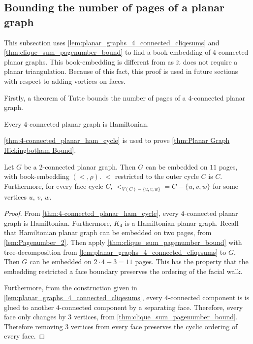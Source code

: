\subsection{Bounding the number of pages of a planar graph}
This subsection uses \cref{lem:planar_graphs_4_connected_cliqesums} and \cref{thm:clique_sum_pagenumber_bound} to find a book-embedding of 4-connected planar graphs. This book-embedding is different from \textcite{yannakakisEmbeddingPlanarGraphs1989} as it does not require a planar triangulation. Because of this fact, this proof is used in future sections with respect to adding vortices on faces. 

Firstly, a theorem of Tutte bounds the number of pages of a $4$-connected planar graph.

\begin{theorem}\label{thm:4-connected_planar_ham_cycle}
	Every 4-connected planar graph is Hamiltonian.
\end{theorem}

\cref{thm:4-connected_planar_ham_cycle} is used to prove \cref{thm:Planar Graph Hickingbotham Bound}.

\begin{corollary}\label{thm:Planar Graph Hickingbotham Bound}
	Let \(G\) be a 2-connected planar graph. Then $G$ can be embedded on $11$ pages, with book-embedding $(<, \rho)$. $<$ restricted to the outer cycle $C$ is $C$. Furthermore, for every face cycle $C$, $<_{V(C) - \{u, v, w\}} = C - \{u, v, w\}$ for some vertices $u$, $v$, $w$. 
\end{corollary}
\begin{proof}
	From \cref{thm:4-connected_planar_ham_cycle}, every $4$-connected planar graph is Hamiltonian. Furthermore, $K_4$ is a Hamiltonian planar graph.
	Recall that Hamiltonian planar graph can be embedded on two pages, from \cref{lem:Pagenumber_2}. 
	Then apply \cref{thm:clique_sum_pagenumber_bound} with tree-decomposition from \cref{lem:planar_graphs_4_connected_cliqesums} to $G$. Then $G$ can be embedded on \(2 \cdot 4 + 3 = 11\) pages. This has the property that the embedding restricted a face boundary preserves the ordering of the facial walk.

	Furthermore, from the construction given in \cref{lem:planar_graphs_4_connected_cliqesums}, every $4$-connected component is is glued to another $4$-connected component by a separating face. Therefore, every face only changes by $3$ vertices, from \cref{thm:clique_sum_pagenumber_bound}. Therefore removing $3$ vertices from every face preserves the cyclic ordering of every face.
\end{proof}

